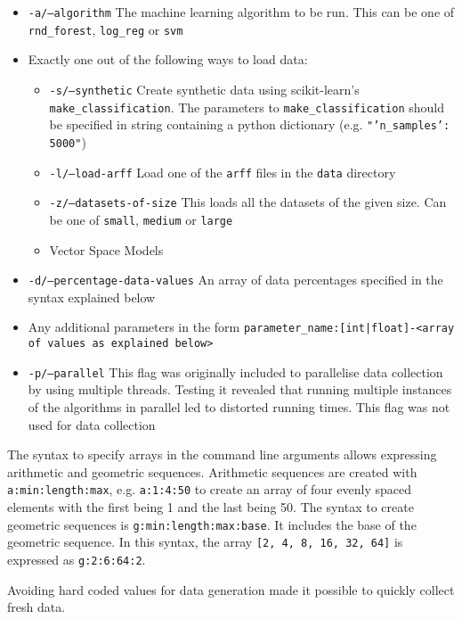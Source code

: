 \documentclass[a4paper,12pt,twoside,openright]{report}
\begin{document}
\begin{itemize}
\item \texttt{-a/--algorithm} The machine learning algorithm to be run. This can be one of \texttt{rnd\_forest}, \texttt{log\_reg} or \texttt{svm}
\item Exactly one out of the following ways to load data:
\begin{itemize}[label=$\star$]
        \item \texttt{-s/--synthetic} Create synthetic data using scikit-learn's \texttt{make\_classification}. The parameters to \texttt{make\_classification} should be specified in string containing a python dictionary (e.g. \texttt{"{'n\_samples': 5000}"})
        \item \texttt{-l/--load-arff} Load one of the \texttt{arff} files in the \texttt{data} directory
        \item \texttt{-z/--datasets-of-size} This loads all the datasets of the given size. Can be one of \texttt{small}, \texttt{medium} or \texttt{large}
        \item Vector Space Models
     \end{itemize}
\item \texttt{-d/--percentage-data-values} An array of data percentages specified in the syntax explained below
\item Any additional parameters in the form \texttt{parameter\_name:[int|float]-<array of values as explained below>}
\item \texttt{-p/--parallel} This flag was originally included to parallelise data collection by using multiple threads. Testing it revealed that running multiple instances of the algorithms in parallel led to distorted running times. This flag was not used for data collection
\end{itemize}

The syntax to specify arrays in the command line arguments allows expressing arithmetic and geometric sequences. Arithmetic sequences are created with \texttt{a:min:length:max}, e.g. \texttt{a:1:4:50} to create an array of four evenly spaced elements with the first being 1 and the last being 50. The syntax to create geometric sequences is \texttt{g:min:length:max:base}. It includes the base of the geometric sequence. In this syntax, the array \texttt{[2, 4, 8, 16, 32, 64]} is expressed as \texttt{g:2:6:64:2}.

Avoiding hard coded values for data generation made it possible to quickly collect fresh data.
	
\end{document}
